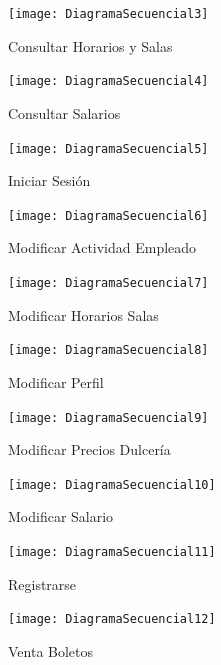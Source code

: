 \documentclass[12pt, fleqn]{report}                             %
\begin{document}
        \begin{figure}[ht]
            \centering
            \texttt{[image: DiagramaSecuencial3]}
            \caption{Consultar Horarios y Salas}
        \end{figure}


        \begin{figure}[ht]
            \centering
            \texttt{[image: DiagramaSecuencial4]}
            \caption{Consultar Salarios}
        \end{figure}


        \begin{figure}[ht]
            \centering
            \texttt{[image: DiagramaSecuencial5]}
            \caption{Iniciar Sesión}
        \end{figure}

        \begin{figure}[ht]
            \centering
            \texttt{[image: DiagramaSecuencial6]}
            \caption{Modificar Actividad Empleado}
        \end{figure}


        \begin{figure}[ht]
            \centering
            \texttt{[image: DiagramaSecuencial7]}
            \caption{Modificar Horarios Salas}
        \end{figure}
        
        \begin{figure}[ht]
            \centering
            \texttt{[image: DiagramaSecuencial8]}
            \caption{Modificar Perfil}
        \end{figure}


        \begin{figure}[ht]
            \centering
            \texttt{[image: DiagramaSecuencial9]}
            \caption{Modificar Precios Dulcería}
        \end{figure}

        \begin{figure}[ht]
            \centering
            \texttt{[image: DiagramaSecuencial10]}
            \caption{Modificar Salario}
        \end{figure}


        \begin{figure}[ht]
            \centering
            \texttt{[image: DiagramaSecuencial11]}
            \caption{Registrarse}
        \end{figure}


        \begin{figure}[ht]
            \centering
            \texttt{[image: DiagramaSecuencial12]}
            \caption{Venta Boletos}
        \end{figure}
\end{document}
